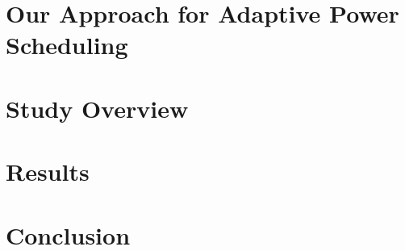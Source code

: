 \section{Our Approach for Adaptive Power Scheduling}
\label{sec:ch4-adaptive}


\section{Study Overview}
\label{sec:ch4-parameters}


\section{Results}
\label{sec:ch4-results}


\section{Conclusion}
\label{sec:ch4-concl}

